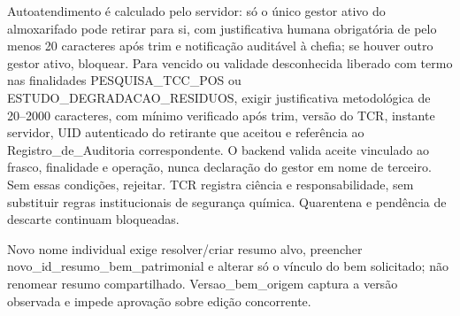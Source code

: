 \begin{regra}
Autoatendimento é calculado pelo servidor: só o único gestor ativo do almoxarifado pode retirar para si, com justificativa humana obrigatória de pelo menos 20 caracteres após trim e notificação auditável à chefia; se houver outro gestor ativo, bloquear. Para vencido ou validade desconhecida liberado com termo nas finalidades PESQUISA\_TCC\_POS ou ESTUDO\_DEGRADACAO\_RESIDUOS, exigir justificativa metodológica de 20--2000 caracteres, com mínimo verificado após trim, versão do TCR, instante servidor, UID autenticado do retirante que aceitou e referência ao Registro\_de\_Auditoria correspondente. O backend valida aceite vinculado ao frasco, finalidade e operação, nunca declaração do gestor em nome de terceiro. Sem essas condições, rejeitar. TCR registra ciência e responsabilidade, sem substituir regras institucionais de segurança química. Quarentena e pendência de descarte continuam bloqueadas.
\end{regra}
\begin{regra}
Novo nome individual exige resolver/criar resumo alvo, preencher novo\_id\_resumo\_bem\_patrimonial e alterar só o vínculo do bem solicitado; não renomear resumo compartilhado. Versao\_bem\_origem captura a versão observada e impede aprovação sobre edição concorrente.
\end{regra}

